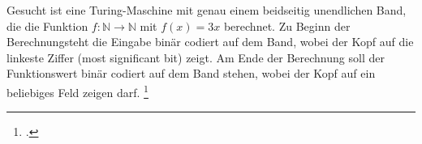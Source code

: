 \documentclass{bschlangaul-aufgabe}
\begin{document}

Gesucht ist eine Turing-Maschine mit genau einem beidseitig unendlichen
Band, die die Funktion $f : \mathbb{N} \rightarrow \mathbb{N}$ mit $f(x)
= 3x$ berechnet. Zu Beginn der Berechnungsteht die Eingabe binär codiert
auf dem Band, wobei der Kopf auf die linkeste Ziffer (most significant
bit) zeigt. Am Ende der Berechnung soll der Funktionswert binär codiert
auf dem Band stehen, wobei der Kopf auf ein beliebiges Feld zeigen darf.
\footcite{examen:66115:2019:09}
\end{document}
